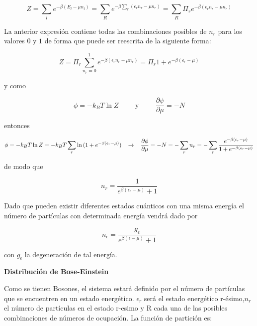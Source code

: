 \documentclass[12pt,a4paper]{article}
\begin{document}
\begin{enumerate}
\begin{equation*}
    Z = \sum_{l} e ^{- \beta (E_l - \mu n_l)} = \sum_{R} e^{- \beta \sum_{r}(\epsilon_r n_r - \mu n_r)} = \sum_{R} \Pi_{r}e^{-\beta (\epsilon_r n_r - \mu n_r)} 
\end{equation*}

La anterior expresión contiene todas las combinaciones posibles de $n_r$ para los valores $0$ y $1$ de forma que puede ser reescrita de la siguiente forma:

\begin{equation*}
    Z = \Pi_{r} \sum_{n_r = 0}^{1} e^{- \beta(\epsilon_r n_r - \mu n_r)} = \Pi_r 1+ e^{- \beta(\epsilon_r - \mu)}
\end{equation*}

y como

\begin{equation*}
    \phi = -k_B T \ln{Z} \hspace{1cm} \text{y} \hspace{1cm} \frac{\partial \psi}{\partial \mu} = -N
\end{equation*}

entonces

\begin{equation*}
    \phi = - k_B T \ln{Z} = -k_B T \sum_{r} \ln{(1+ e^{- \beta(\epsilon_r - \mu)})} \hspace{0.3cm} \rightarrow \hspace{0.3cm} \frac{\partial\phi}{\partial \mu} = - N = - \sum_{r} n_r = - \sum_{r} \frac{e^{-\beta(\epsilon_r - \mu)}}{1+ e^{-\beta(\epsilon_r - \mu)}}
\end{equation*}

de modo que

\begin{equation*}
    n_r = \frac{1}{e^{\beta(\epsilon_r - \mu)} + 1}
\end{equation*}

Dado que pueden existir diferentes estados cuánticos con una misma energía el número de partículas con determinada energía vendrá dado por

\begin{equation*}
    n_\epsilon = \frac{g_\epsilon}{e^{\beta(\epsilon - \mu)} + 1}
\end{equation*}

con $g_\epsilon$ la degeneración de tal energía.

\textbf{Distribución de Bose-Einstein}

Como se tienen Bosones, el sistema estará definido por el número de partículas que se encuentren en un estado energético. $\epsilon_r$ será el estado energético r-ésimo,$n_r$ el número de partículas en el estado r-esimo  y R cada una de las posibles combinaciones de números de ocupación. La función de partición es:


\end{enumerate}
\end{document}
